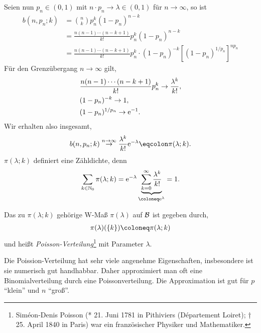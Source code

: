 Seien nun $p_n\in (0,1)$ mit $n\cdot p_n\to \lambda\in(0,1)$ für $n\to\infty$,
so ist
\begin{align*}
b(n,p_n;k) &= \binom{n}{k} p_n^k(1-p_n)^{n-k} \\ &= \frac{n(n-1)\cdots
(n-k+1)}{k!} p_n^k (1-p_n)^{n-k} \\&
= \frac{n(n-1)\cdots(n-k+1)}{k!}p_n^k \cdot 
(1-p_n)^{-k}\left[(1-p_n)^{1/p_n}\right]^{np_n}
\end{align*}
Für den Grenzübergang $n\to\infty$ gilt,
\begin{align*}
&\frac{n(n-1)\cdots(n-k+1)}{k!}p_n^k \to \frac{\lambda^k}{k!},\\
&(1-p_n)^{-k} \to 1,\\
&(1-p_n)^{1/p_n} \to \mathrm{e}^{-1}.
\end{align*}
Wir erhalten also insgesamt,
\begin{align*}
b(n,p_n;k) \overset{n\to\infty}{\to}
\frac{\lambda^k}{k!}\e^{-\lambda}\defr\pi(\lambda;k).
\end{align*}
$\pi(\lambda;k)$ definiert eine Zähldichte, denn
\begin{align*}
\sum\limits_{k\in\N_0} \pi(\lambda;k)
= \e^{-\lambda}\underbrace{\sum\limits_{k=0}^\infty
\frac{\lambda^k}{k!}}_{\defl\e^\lambda} = 1.
\end{align*}
\begin{defn}
Das zu $\pi(\lambda;k)$ gehörige W-Maß $\pi(\lambda)$ auf $\mathcal{B}$ ist gegeben
durch,
\begin{align*}
\pi(\lambda)(\setd{k}) \defl \pi(\lambda;k)
\end{align*}
und heißt \emph{Poisson-Verteilung}\footnote{Siméon-Denis Poisson (* 21. Juni
1781 in Pithiviers (Département Loiret); † 25. April 1840 in Paris) war ein
französischer Physiker und Mathematiker.} mit Parameter $\lambda$.\fishhere
\end{defn}

Die Poission-Verteilung hat sehr viele angenehme Eigenschaften, insbesondere
ist sie numerisch gut handhabbar. Daher approximiert man oft eine
Binomialverteilung durch eine Poissonverteilung. Die Approximation ist gut für
$p$ ``klein'' und $n$ ``groß''.

